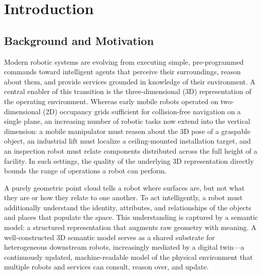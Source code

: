 \chapter{Introduction}
\label{ch:intro}

\section{Background and Motivation}
\label{sec:background}

Modern robotic systems are evolving from executing simple, pre-programmed
commands toward intelligent agents that perceive their surroundings, reason
about them, and provide services grounded in knowledge of their environment. A
central enabler of this transition is the three-dimensional (3D) representation
of the operating environment. Whereas early mobile robots operated on
two-dimensional (2D) occupancy grids sufficient for collision-free navigation on
a single plane, an increasing number of robotic tasks now extend into the
vertical dimension: a mobile manipulator must reason about the 3D pose of a
graspable object, an industrial lift must localize a ceiling-mounted
installation target, and an inspection robot must relate components distributed
across the full height of a facility. In such settings, the quality of the
underlying 3D representation directly bounds the range of operations a robot
can perform.

A purely geometric point cloud tells a robot where surfaces are, but not what
they are or how they relate to one another. To act intelligently, a robot must
additionally understand the identity, attributes, and relationships of the
objects and places that populate the space. This understanding is captured by a
semantic model: a structured representation that augments raw geometry with
meaning. A well-constructed 3D semantic model serves as a shared substrate for
heterogeneous downstream robots, increasingly mediated by a digital twin---a
continuously updated, machine-readable model of the physical environment that
multiple robots and services can consult, reason over, and update.

